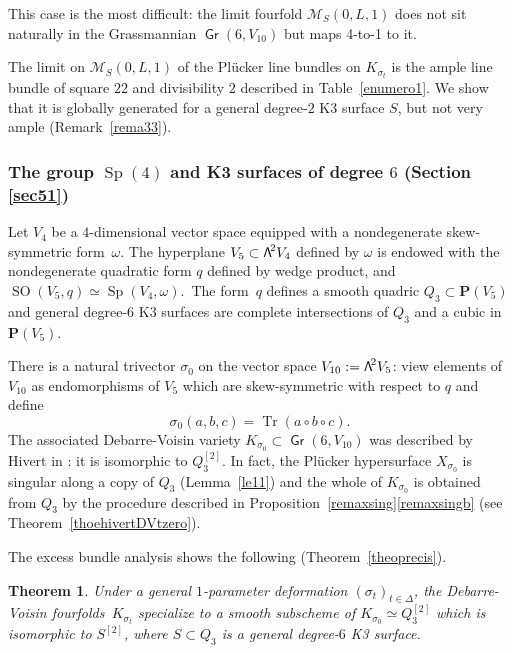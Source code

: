 \documentclass[11pt]{article}
\let\mathcal\mathscr
\newtheorem{theo}[lemm]{Theorem}
\theoremstyle{definition}
\renewcommand\P{{\mathbf P}}\let\PP\P
\newcommand\cM{\mathcal{M}}
\DeclareMathOperator{\Gr}{\mathsf{Gr}}
\let\isom\simeq
\let\cong\simeq
\DeclareMathOperator{\SO}{SO}
\DeclareMathOperator{\Sp}{Sp}
\DeclareMathOperator{\Tr}{Tr}
\newcommand\bw[1]{{\hbox{\large$\mathsf{\Lambda}$}^{\!#1}}}
\newcommand\hilb{{Q_3^{[2]}}}
\newcommand\hilbS{S^{[2]}}
\begin{document}
This case is the most difficult: the limit fourfold $\cM_S(0,L,1)$ does not sit naturally in the Grassmannian $\Gr(6,V_{10})$ but maps 4-to-1 to it.

{The limit on $\cM_S(0,L,1)$ of the Plücker line bundles on $K_{\sigma_t}$ is the
ample line bundle of square $22$ and divisibility $2$
described in Table~\ref{enumero1}.
We show that it is globally generated for a general degree-$2$ K3 surface $S$, but not very ample (Remark~\ref{rema33}).}

\subsubsection{The group $\Sp(4)$ and K3 surfaces of degree $6$ (Section \ref{sec51})}\label{se112}
Let $V_4$ be a $4$\nobreakdash-dimensional vector space equipped with a nondegenerate skew-symmetric form~$\omega$. The hyperplane
$V_5\subset \bw2V_4 $ defined by $\omega$ is endowed with the nondegenerate quadratic form $q$ defined by wedge product, and
{$\SO(V_5,q)\cong \Sp(V_4,\omega)$.}\ The form~$q$ defines a smooth quadric $Q_3\subset \P(V_5)$ and general degree-$6$ K3 surfaces are complete intersections of $Q_3$ and a cubic in $\P(V_5) $.

There is a natural trivector $\sigma_0$ on
the vector space $V_{10}:=\bw2V_5$:
view
elements of~$V_{10}$ as endomorphisms of $V_5$ which are skew-symmetric with respect to $q$ and define
\begin{equation}\label{si0}
\sigma_0(a, b, c)=\Tr(a\circ b\circ c).
\end{equation}
The associated Debarre-Voisin variety $K_{\sigma_0}\subset \Gr (6, V_{10} ) $ was described by Hivert in \cite{hivert}: it is isomorphic to $\hilb$. In fact, the Plücker hypersurface $X_{\sigma_0}$ is singular along a copy of $Q_3$ (Lemma~\ref{le11}) and the whole of $K_{\sigma_0}$ is obtained from $Q_3$ by the procedure described in Proposition~\ref{remaxsing}\eqref{remaxsingb} (see Theorem~\ref{thoehivertDVtzero}).

The excess bundle analysis shows the following (Theorem~\ref{theoprecis}).

\begin{theo} \label{theohas}
Under a general $1$-parameter deformation
$(\sigma_t)_{t\in \Delta}$, the Debarre-Voisin fourfolds~$K_{\sigma_t}$ specialize to a smooth subscheme of $K_{\sigma_0}\isom \hilb$ which is isomorphic to
$\hilbS$, where $S\subset Q_3$ is a general degree-$6$ K3 surface.
\end{theo}
\end{document}
